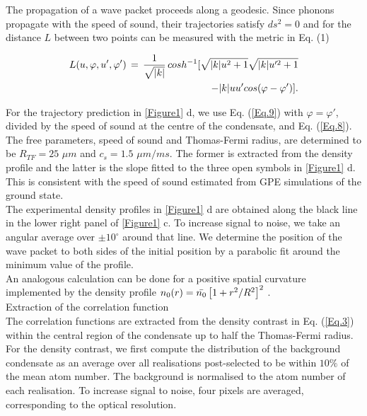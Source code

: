 \documentclass[11pt,twocolumn,letterpaper]{article}
\newcounter{ns}
\begin{document}
The propagation of a wave packet proceeds along a geodesic. Since phonons propagate with the speed of sound, their trajectories satisfy $ds^{2} = 0$ and for the distance $L$ between two points can be measured with the metric in Eq. (1)

\begin{equation}
    \label{Eq.9}
    \begin{split}
    L(u, \varphi, u', \varphi') \thinspace = \thinspace \frac{1}{\sqrt{| k |}} \thinspace cosh^{-1} [ \sqrt{| k | u^{2} + 1} \sqrt{| k | u'^{2} + 1}\\
    - | k | u u' cos (\varphi - \varphi') ] . 
    \end{split}
\end{equation}


For the trajectory prediction in \ref{Figure1} d, we use Eq. (\ref{Eq.9}) with $\varphi = \varphi'$, divided by the speed of sound at the centre of the condensate, and Eq. (\ref{Eq.8}).\\

The free parameters, speed of sound and Thomas-Fermi radius, are determined to be $R_{TF} = 25$ $\mu m$ and $c_{s} = 1.5$ $\mu m / ms$. The former is extracted from the density profile and the latter is the slope fitted to the three open symbols in \ref{Figure1} d. This is consistent with the speed of sound estimated from GPE simulations of the ground state.\\

The experimental density profiles in \ref{Figure1} d are obtained along the black line in the lower right panel of \ref{Figure1} c. To increase signal to noise, we take an angular average over $\pm 10^{\circ}$ around that line. We determine the position of the wave packet to both sides of the initial position by a parabolic fit around the minimum value of the profile.\\

An analogous calculation can be done for a positive spatial curvature implemented by the density profile $n_{0} (r) = \Bar{n_{0}} \left[ 1 + r^{2} / R^{2} \right]^{2}$ \cite{Lb.32}.\\

Extraction of the correlation function\\

The correlation functions are extracted from the density contrast in Eq. (\ref{Eq.3}) within the central region of the condensate up to half the Thomas-Fermi radius. For the density contrast, we first compute the distribution of the background condensate as an average over all realisations post-selected to be within $10\%$ of the mean atom number. The background is normalised to the atom number of each realisation. To increase signal to noise, four pixels are averaged, corresponding to the optical resolution.\\
\end{document}
